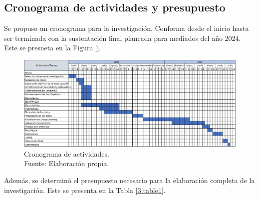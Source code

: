 \begin{landscape}
	\section{Cronograma de actividades y presupuesto}
	Se propuso un cronograma para la investigación. Conforma desde el inicio hasta ser terminada con la sustentación final planeada para mediados del año 2024. Este se presneta en la Figura \ref{3:fig303}.

	\begin{figure}[!ht]
		\begin{center}
			\includegraphics[width=1.50\textwidth]{3/figures/cronograma_tesis_thyr.jpg}
			\caption[Cronograma de actividades]{Cronograma de actividades.\\
				Fuente: Elaboración propia.}
			\label{3:fig303}
		\end{center}
	\end{figure}
	
\end{landscape}

Además, se determinó el presupuesto necesario para la elaboración completa de la investigación. Este se presenta en la Tabla \ref{3:table1}.

